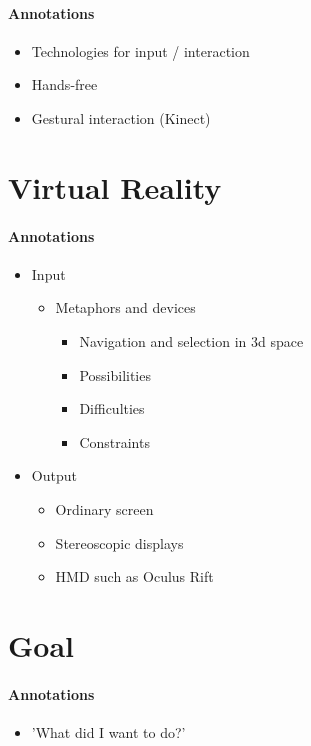 \paragraph{Annotations}

\begin{itemize}
	\item Technologies for input / interaction
	\item Hands-free
	\item Gestural interaction (Kinect)
\end{itemize}


\section{Virtual Reality}
\label{motivation_vr}

\paragraph{Annotations}

\begin{itemize}
	\item Input
	\begin{itemize}
		\item Metaphors and devices
		\begin{itemize}
			\item Navigation and selection in 3d space
			\item Possibilities
			\item Difficulties
			\item Constraints
		\end{itemize}
	\end{itemize}
	\item Output
	\begin{itemize}
		\item Ordinary screen
		\item Stereoscopic displays
		\item \ac{HMD} such as Oculus Rift
	\end{itemize}
\end{itemize}


\section{Goal}
\label{motivation_goal}

\paragraph{Annotations}

\begin{itemize}
	\item 'What did I want to do?'
\end{itemize}